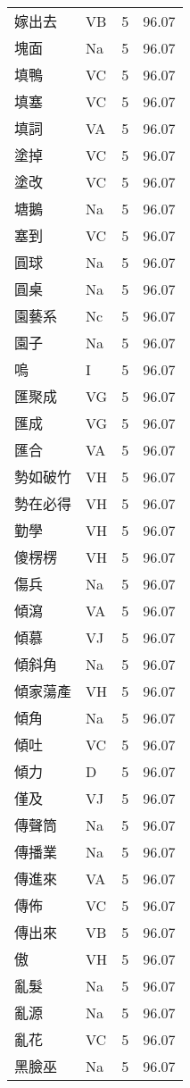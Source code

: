 \documentclass[twocolumn]{book}
\begin{document}
\begin{supertabular}{llrr}
嫁出去 & VB & 5 &  96.07\\
塊面 & Na & 5 &  96.07\\
填鴨 & VC & 5 &  96.07\\
填塞 & VC & 5 &  96.07\\
填詞 & VA & 5 &  96.07\\
塗掉 & VC & 5 &  96.07\\
塗改 & VC & 5 &  96.07\\
塘鵝 & Na & 5 &  96.07\\
塞到 & VC & 5 &  96.07\\
圓球 & Na & 5 &  96.07\\
圓桌 & Na & 5 &  96.07\\
園藝系 & Nc & 5 &  96.07\\
園子 & Na & 5 &  96.07\\
嗚 & I & 5 &  96.07\\
匯聚成 & VG & 5 &  96.07\\
匯成 & VG & 5 &  96.07\\
匯合 & VA & 5 &  96.07\\
勢如破竹 & VH & 5 &  96.07\\
勢在必得 & VH & 5 &  96.07\\
勤學 & VH & 5 &  96.07\\
傻楞楞 & VH & 5 &  96.07\\
傷兵 & Na & 5 &  96.07\\
傾瀉 & VA & 5 &  96.07\\
傾慕 & VJ & 5 &  96.07\\
傾斜角 & Na & 5 &  96.07\\
傾家蕩產 & VH & 5 &  96.07\\
傾角 & Na & 5 &  96.07\\
傾吐 & VC & 5 &  96.07\\
傾力 & D & 5 &  96.07\\
僅及 & VJ & 5 &  96.07\\
傳聲筒 & Na & 5 &  96.07\\
傳播業 & Na & 5 &  96.07\\
傳進來 & VA & 5 &  96.07\\
傳佈 & VC & 5 &  96.07\\
傳出來 & VB & 5 &  96.07\\
傲 & VH & 5 &  96.07\\
亂髮 & Na & 5 &  96.07\\
亂源 & Na & 5 &  96.07\\
亂花 & VC & 5 &  96.07\\
黑臉巫 & Na & 5 &  96.07\\

\end{supertabular}
\end{document}
